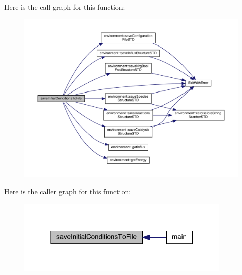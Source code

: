 Here is the call graph for this function\+:\nopagebreak
\begin{figure}[H]
\begin{center}
\leavevmode
\includegraphics[width=350pt]{a00068_a4665c5f33b43dfc8fae4757552028cc0_cgraph}
\end{center}
\end{figure}




Here is the caller graph for this function\+:\nopagebreak
\begin{figure}[H]
\begin{center}
\leavevmode
\includegraphics[width=290pt]{a00068_a4665c5f33b43dfc8fae4757552028cc0_icgraph}
\end{center}
\end{figure}



